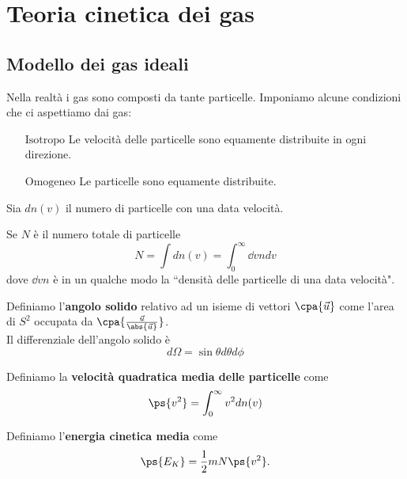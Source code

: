 \chapter{Teoria cinetica dei gas}


\section{Modello dei gas ideali}
Nella realt\`a i gas sono composti da tante particelle. Imponiamo alcune condizioni che ci aspettiamo dai gas:
\setlength{\leftmargini}{0cm}
\begin{itemize}
\item[$\boxed{\text{Isotropo}}$] Le velocit\`a delle particelle sono equamente distribuite in ogni direzione.
\item[$\boxed{\text{Omogeneo}}$] Le particelle sono equamente distribuite.
\end{itemize}
\setlength{\leftmargini}{0.5cm}
Sia $dn(v)$ il numero di particelle con una data velocit\`a.
\begin{remark}
Se $N$ \`e il numero totale di particelle
\[N=\int dn(v)=\int_0^\infty \dd vndv\]
dove $\dd vn$ \`e in un qualche modo la ``densit\`a delle particelle di una data velocit\`a".
\end{remark}

\begin{definition}
Definiamo l'\textbf{angolo solido} relativo ad un isieme di vettori $\cpa{\vec u}$ come l'area di $S^2$ occupata da $\cpa{\frac{\vec u}{\abs{\vec u}}}$.\\
Il differenziale dell'angolo solido \`e 
\[d\Omega=\sin\theta d\theta d\phi\]
\end{definition}

\begin{definition}
Definiamo la \textbf{velocit\`a quadratica media delle particelle} come
\[\ps{v^2}=\int_0^\infty v^2dn(v)\] 
\end{definition}

\begin{definition}
Definiamo l'\textbf{energia cinetica media} come \[\ps{E_K}=\frac12mN\ps{v^2}.\]
\end{definition}

